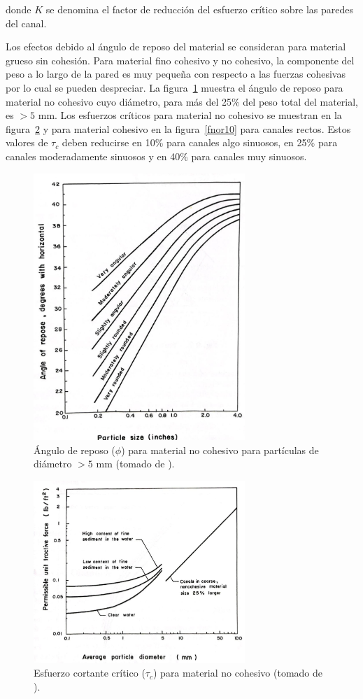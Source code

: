 \documentclass[11pt, oneside]{article}
\begin{document}
donde $K$ se denomina el factor de reducci\'on del esfuerzo cr\'itico sobre las paredes del canal.

Los efectos debido al \'angulo de reposo del material se consideran para material grueso sin cohesi\'on. Para material fino cohesivo y no cohesivo, la componente del peso a lo largo de la pared es muy pequeña con respecto a las fuerzas cohesivas por lo cual se pueden despreciar. La figura~\ref{fnor8} muestra el \'angulo de reposo para material no cohesivo cuyo di\'ametro, para m\'as del 25\% del peso total del material, es $>5$ mm. Los esfuerzos cr\'iticos para material no cohesivo se muestran en la figura~\ref{fnor9} y para material cohesivo en la figura~\ref{fnor10} para canales rectos. Estos valores de $\tau_c$ deben reducirse en 10\% para canales algo sinuosos, en 25\% para canales moderadamente sinuosos y en 40\% para canales muy sinuosos. 

\begin{figure}[h!]
\centering
\includegraphics[width=8cm]{fig93.jpeg}
\caption{\'Angulo de reposo ($\phi$) para material no cohesivo  para part\'iculas de di\'ametro $> 5$ mm (tomado de \cite{Chau}).}
\label{fnor8}
\end{figure}

\begin{figure}[h!]
\centering
\includegraphics[width=8cm]{fig94.jpeg}
\caption{Esfuerzo cortante cr\'itico ($\tau_c$) para material no cohesivo (tomado de \cite{Chau}).}
\label{fnor9}
\end{figure}
\end{document}
